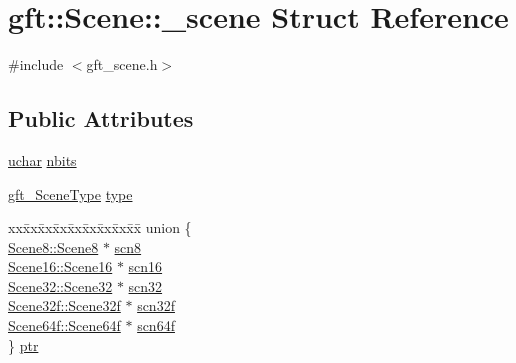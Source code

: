 \hypertarget{structgft_1_1Scene_1_1__scene}{}\section{gft\+:\+:Scene\+:\+:\+\_\+scene Struct Reference}
\label{structgft_1_1Scene_1_1__scene}


{\ttfamily \#include $<$gft\+\_\+scene.\+h$>$}

\subsection*{Public Attributes}
\begin{DoxyCompactItemize}
\item 
\hyperlink{namespacegft_a6411e297d5ac5aa9b91a37da00952197}{uchar} \hyperlink{structgft_1_1Scene_1_1__scene_a8751823cdf9cb3e6425267985f6581b5}{nbits}
\item 
\hyperlink{gft__scene_8h_aff9f098ca5c194977bd33369499b22ed}{gft\+\_\+\+Scene\+Type} \hyperlink{structgft_1_1Scene_1_1__scene_a40b5c581b52b256d8a2fce38b3bfca99}{type}
\item 
\begin{tabbing}
xx\=xx\=xx\=xx\=xx\=xx\=xx\=xx\=xx\=\kill
union \{\\
\>\hyperlink{namespacegft_1_1Scene8_a78f9a172f8a505f9577adac7f85bc009}{Scene8::Scene8} $\ast$ \hyperlink{structgft_1_1Scene_1_1__scene_a8fe4664ea98a23e82a062375e72ec42e}{scn8}\\
\>\hyperlink{namespacegft_1_1Scene16_a5a4b9571f9e3e6e1393f03bc708bf5ae}{Scene16::Scene16} $\ast$ \hyperlink{structgft_1_1Scene_1_1__scene_af117843d6931f2303f5764b8384c3674}{scn16}\\
\>\hyperlink{namespacegft_1_1Scene32_ae492ac529c9149889605a7bebd647c46}{Scene32::Scene32} $\ast$ \hyperlink{structgft_1_1Scene_1_1__scene_aa2840b6d1c3fbb4aed6aff4d288d197a}{scn32}\\
\>\hyperlink{namespacegft_1_1Scene32f_af233a2e92a79c7b46da9b3f38677644a}{Scene32f::Scene32f} $\ast$ \hyperlink{structgft_1_1Scene_1_1__scene_a92e7c0a96c2dab89917ad81d0c39bf3a}{scn32f}\\
\>\hyperlink{namespacegft_1_1Scene64f_a512a42827b5e024a75792dd3e6fca5eb}{Scene64f::Scene64f} $\ast$ \hyperlink{structgft_1_1Scene_1_1__scene_a7a635c7c4abf82e0fe0740510c54b775}{scn64f}\\
\} \hyperlink{structgft_1_1Scene_1_1__scene_ad4d1cdf15700c3e3b5c935df677d1d2c}{ptr}\\

\end{tabbing}\end{DoxyCompactItemize}


